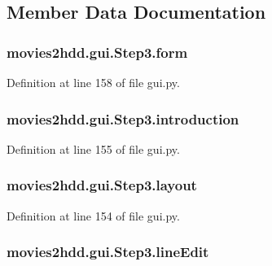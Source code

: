 \subsection{Member Data Documentation}
\hypertarget{classmovies2hdd_1_1gui_1_1_step3_affbacc9b3831417408811bd57aa7af76}{
\subsubsection[{form}]{\setlength{\rightskip}{0pt plus 5cm}movies2hdd.\-gui.\-Step3.\-form}}\label{classmovies2hdd_1_1gui_1_1_step3_affbacc9b3831417408811bd57aa7af76}


Definition at line 158 of file gui.\-py.

\hypertarget{classmovies2hdd_1_1gui_1_1_step3_acac006717bba2aa2f5834fecf3db359f}{
\subsubsection[{introduction}]{\setlength{\rightskip}{0pt plus 5cm}movies2hdd.\-gui.\-Step3.\-introduction}}\label{classmovies2hdd_1_1gui_1_1_step3_acac006717bba2aa2f5834fecf3db359f}


Definition at line 155 of file gui.\-py.

\hypertarget{classmovies2hdd_1_1gui_1_1_step3_a219925352b4ccaef913b4530039cefd3}{
\subsubsection[{layout}]{\setlength{\rightskip}{0pt plus 5cm}movies2hdd.\-gui.\-Step3.\-layout}}\label{classmovies2hdd_1_1gui_1_1_step3_a219925352b4ccaef913b4530039cefd3}


Definition at line 154 of file gui.\-py.

\hypertarget{classmovies2hdd_1_1gui_1_1_step3_a7d8d7669f3636fb078fa022ebc1906bd}{
\subsubsection[{line\-Edit}]{\setlength{\rightskip}{0pt plus 5cm}movies2hdd.\-gui.\-Step3.\-line\-Edit}}\label{classmovies2hdd_1_1gui_1_1_step3_a7d8d7669f3636fb078fa022ebc1906bd}


